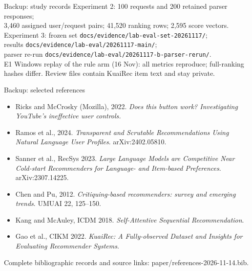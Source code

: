 \documentclass[10pt]{beamer}
\newcommand{\src}[1]{\vfill{\tiny\color{bcitgray}#1}}
\begin{document}
\begin{frame}{Backup: study records}
\small
Experiment 2: 100 requests and 200 retained parser responses;\\
3,460 assigned user/request pairs; 41,520 ranking rows; 2,595 score vectors.\\[0.3cm]
Experiment 3: frozen set \texttt{docs/evidence/lab-eval-set-20261117/};\\
results \texttt{docs/evidence/lab-eval/20261117-main/};\\
parser re-run \texttt{docs/evidence/lab-eval/20261117-b-parser-rerun/}.\\[0.3cm]
E1 Windows replay of the rule arm (16 Nov): all metrics reproduce; full-ranking hashes differ.
\src{Review files contain KuaiRec item text and stay private.}
\end{frame}

\begin{frame}{Backup: selected references}
\footnotesize
\begin{itemize}
\item Ricks and McCrosky (Mozilla), 2022. \emph{Does this button work? Investigating YouTube's ineffective user controls.}
\item Ramos et al., 2024. \emph{Transparent and Scrutable Recommendations Using Natural Language User Profiles}. arXiv:2402.05810.
\item Sanner et al., RecSys 2023. \emph{Large Language Models are Competitive Near Cold-start Recommenders for Language- and Item-based Preferences}. arXiv:2307.14225.
\item Chen and Pu, 2012. \emph{Critiquing-based recommenders: survey and emerging trends}. UMUAI 22, 125--150.
\item Kang and McAuley, ICDM 2018. \emph{Self-Attentive Sequential Recommendation}.
\item Gao et al., CIKM 2022. \emph{KuaiRec: A Fully-observed Dataset and Insights for Evaluating Recommender Systems}.
\end{itemize}
\src{Complete bibliographic records and source links: paper/references-2026-11-14.bib.}
\end{frame}
\end{document}
